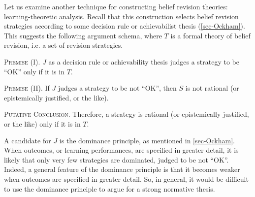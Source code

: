 Let us examine another technique for constructing belief revision theories: learning-theoretic analysis. Recall that this construction selects belief revision strategies according to some decision rule or achievabilist thesis (\autoref{sec-Ockham}). This suggests the following argument schema, where $T$ is a formal theory of belief revision, i.e. a set of revision strategies.\op

	\xm \textsc{Premise (I).} $J$ as a decision rule or achievability thesis judges a strategy to be ``OK'' only if it is in $T$.

	\xm \textsc{Premise (II).} If $J$ judges a strategy to be not ``OK'', then $S$ is not rational (or epistemically justified, or the like).

	\xm \textsc{Putative Conclusion.} Therefore, a strategy is rational (or epistemically justified, or the like) only if it is in $T$.  

\ed 

A candidate for $J$ is the dominance principle, as mentioned in \autoref{sec-Ockham}. When outcomes, or learning performances, are specified in greater detail, it is likely that only very few strategies are dominated, judged to be not ``OK''. Indeed, a general feature of the dominance principle is that it becomes weaker when outcomes are specified in greater detail. So, in general, it would be difficult to use the dominance principle to argue for a strong normative thesis. 

